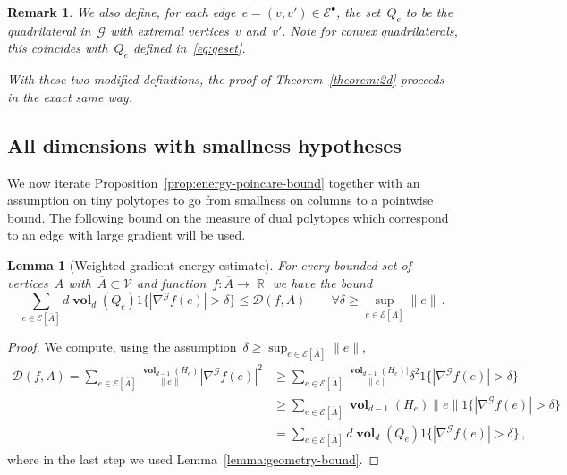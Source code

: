 \documentclass[12pt]{amsart}
\numberwithin{equation}{section}
\DeclareMathOperator{\R}{\mathbb{R}}
\newtheorem{lemma}[theorem]{Lemma}
\newtheorem{remark}[theorem]{Remark}
\newcommand{\G}{\mathcal{G}}
\newcommand{\V}{\mathcal{V}}
\newcommand{\E}{\mathcal{E}}
\newcommand{\D}{\hyperref[eq:dir.energy]{\mathcal{D}}}
\newcommand{\Qe}{\hyperref[eq:qeset]{Q_e}}
\DeclareMathOperator{\vol}{\mathbf{vol}}
\begin{document}
\begin{remark}
We also define, for each edge~$e = (v,v') \in \mathcal{E}^{\bullet}$, the set~$Q_e$ to be the quadrilateral in~$\G$ with extremal vertices~$v$ and~$v'$. Note for convex quadrilaterals, this coincides with~$\Qe$ defined in~\eqref{eq:qeset}. 

With these two modified definitions, the proof of Theorem~\ref{theorem:2d} proceeds in the exact same way. 
\end{remark}



\subsection{All dimensions with smallness hypotheses}
We now iterate Proposition~\ref{prop:energy-poincare-bound} 
together with an assumption on tiny polytopes to go from smallness on columns to a pointwise bound.  The following bound on the measure of dual polytopes which correspond to an edge with large gradient will be used. 


\begin{lemma}[Weighted gradient-energy estimate]
	\label{lemma:gradient-energy-estimate}
	For every bounded set of vertices~$A$ with~$\overline A \subset \V$ and function~$f: \overline{A} \to \R$  we have
	the bound
	\[
	 \sum_{e \in \E[\overline{A}]} d \vol_{d}(\Qe)  1\{ |\nabla^{\mathcal{G}} f(e)| > \delta\}  \leq \D(f, A) 	 \qquad \forall \delta \geq \sup_{e \in \E[\overline{A}]} \|e\| \, . 
	\]
\end{lemma}
\begin{proof}
	We compute, using the assumption~$\delta \geq \sup_{e \in \E[\overline{A}]} \|e\|$, 
	\begin{align*}
		\D(f, A)  =  \sum_{e \in \E[\overline{A}]} \frac{\vol_{d-1}(H_e)}{\|e\|} |\nabla^{\mathcal{G}} f(e)|^2  
		&\geq \sum_{e \in \E[\overline{A}]} \frac{\vol_{d-1}(H_e)|}{\|e\|} \delta^2 1\{ |\nabla^{\mathcal{G}} f(e)| > \delta\} \\
		&\geq \sum_{e \in \E[\overline{A}]} \vol_{d-1}(H_e) \|e\|   1\{ |\nabla^{\mathcal{G}} f(e)| > \delta\}  \\
		&= \sum_{e \in \E[\overline{A}]} d \vol_{d}(\Qe)  1\{ |\nabla^{\mathcal{G}} f(e)| > \delta\}  \, , 
	\end{align*}
	where in the last step we used Lemma~\ref{lemma:geometry-bound}. 
\end{proof}
\end{document}
